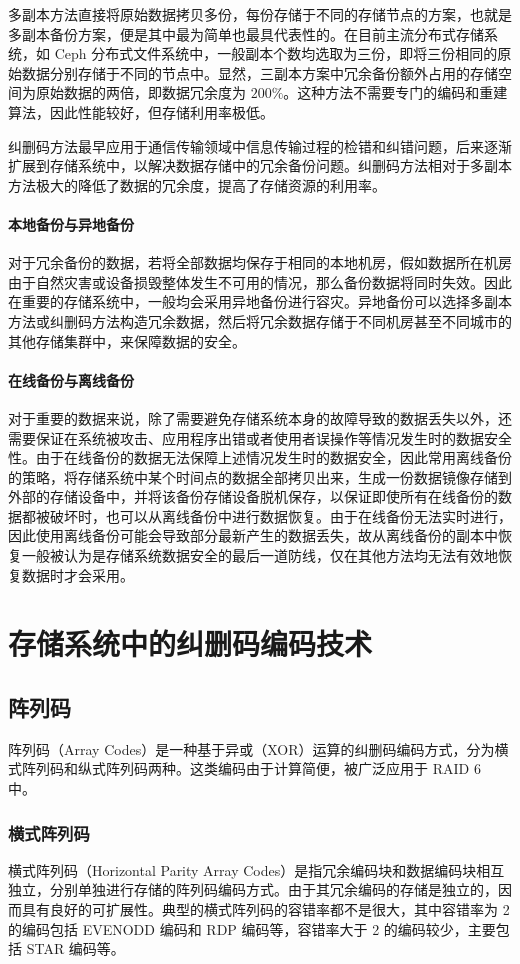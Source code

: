 多副本方法直接将原始数据拷贝多份，每份存储于不同的存储节点的方案，也就是多副本备份方案，便是其中最为简单也最具代表性的。在目前主流分布式存储系统，如 Ceph 分布式文件系统中，一般副本个数均选取为三份，即将三份相同的原始数据分别存储于不同的节点中。显然，三副本方案中冗余备份额外占用的存储空间为原始数据的两倍，即数据冗余度为 $200\%$。这种方法不需要专门的编码和重建算法，因此性能较好，但存储利用率极低。

纠删码方法最早应用于通信传输领域中信息传输过程的检错和纠错问题，后来逐渐扩展到存储系统中，以解决数据存储中的冗余备份问题。纠删码方法相对于多副本方法极大的降低了数据的冗余度，提高了存储资源的利用率。
\paragraph{本地备份与异地备份}
对于冗余备份的数据，若将全部数据均保存于相同的本地机房，假如数据所在机房由于自然灾害或设备损毁整体发生不可用的情况，那么备份数据将同时失效。因此在重要的存储系统中，一般均会采用异地备份进行容灾。异地备份可以选择多副本方法或纠删码方法构造冗余数据，然后将冗余数据存储于不同机房甚至不同城市的其他存储集群中，来保障数据的安全。
\paragraph{在线备份与离线备份}
对于重要的数据来说，除了需要避免存储系统本身的故障导致的数据丢失以外，还需要保证在系统被攻击、应用程序出错或者使用者误操作等情况发生时的数据安全性。由于在线备份的数据无法保障上述情况发生时的数据安全，因此常用离线备份的策略，将存储系统中某个时间点的数据全部拷贝出来，生成一份数据镜像存储到外部的存储设备中，并将该备份存储设备脱机保存，以保证即使所有在线备份的数据都被破坏时，也可以从离线备份中进行数据恢复。由于在线备份无法实时进行，因此使用离线备份可能会导致部分最新产生的数据丢失，故从离线备份的副本中恢复一般被认为是存储系统数据安全的最后一道防线，仅在其他方法均无法有效地恢复数据时才会采用。
\section{存储系统中的纠删码编码技术}
\subsection{阵列码}
阵列码（Array Codes）是一种基于异或（XOR）运算的纠删码编码方式，分为横式阵列码和纵式阵列码两种。这类编码由于计算简便\cite{yuan2019research}，被广泛应用于 RAID 6 中\cite{xie2019n,plank2008raid,feng2010eeo,jin2009p}。
\subsubsection{横式阵列码}
横式阵列码（Horizontal Parity Array Codes）是指冗余编码块和数据编码块相互独立，分别单独进行存储的阵列码编码方式。由于其冗余编码的存储是独立的，因而具有良好的可扩展性。典型的横式阵列码的容错率都不是很大，其中容错率为 2 的编码包括 EVENODD 编码\cite{blaum1995evenodd}和 RDP 编码\cite{corbett2004row}等，容错率大于 2 的编码较少，主要包括 STAR 编码\cite{huang2008star}等。

